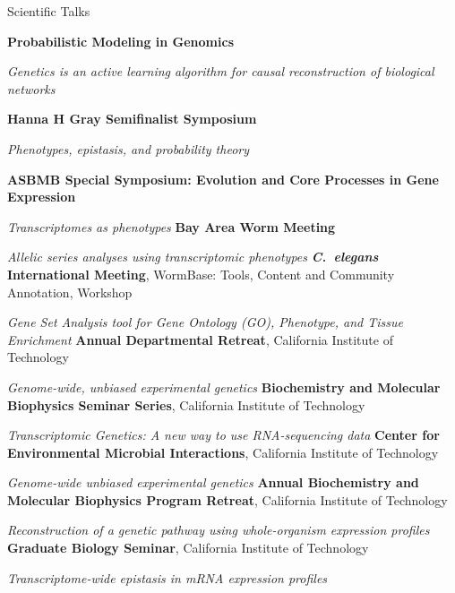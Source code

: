 \begin{rubric}{Scientific Talks}

\entry*[2019]
  \textbf{Probabilistic Modeling in Genomics}\par
    \emph{Genetics is an active learning algorithm for causal reconstruction of
          biological networks}\par
  \textbf{Hanna H Gray Semifinalist Symposium}\par
  \emph{Phenotypes, epistasis, and probability theory}

  \textbf{ASBMB Special Symposium: Evolution and Core Processes in
          Gene Expression}\par
  \emph{Transcriptomes as phenotypes}
\entry*[2018]
  \textbf{Bay Area Worm Meeting}\par
  \emph{Allelic series analyses using transcriptomic phenotypes}
\entry*[2017]
  \textbf{ \emph{C.~elegans} International Meeting}, WormBase: Tools,
  Content and Community Annotation, Workshop\par
  \emph{Gene Set Analysis tool for Gene Ontology (GO), Phenotype, and Tissue
  Enrichment}
\entry*[2017]
  \textbf{Annual Departmental Retreat}, California Institute of Technology\par
  \emph{Genome-wide, unbiased experimental genetics}
\entry*[2017]
  \textbf{Biochemistry and Molecular Biophysics Seminar Series}, California
  Institute of Technology\par
  \emph{Transcriptomic Genetics: A new way to use RNA-sequencing data}
\entry*[2017]
  \textbf{Center for Environmental Microbial Interactions}, California Institute
  of Technology\par
  \emph{Genome-wide unbiased experimental genetics}
\entry*[2016]
  \textbf{Annual Biochemistry and Molecular Biophysics Program Retreat},
  California Institute of Technology\par
  \emph{Reconstruction of a genetic pathway using whole-organism expression
  profiles}
\entry*[2016]
  \textbf{Graduate Biology Seminar}, California Institute of Technology\par
  \emph{Transcriptome-wide epistasis in mRNA expression profiles}

\end{rubric}
